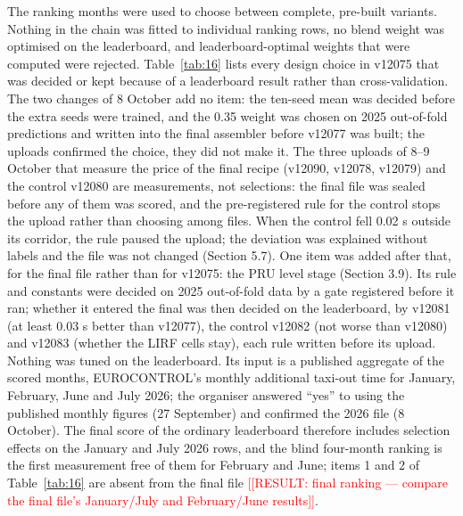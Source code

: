 \documentclass[11pt,a4paper]{article}
\newcommand{\placeholder}[1]{\textcolor{red}{[[RESULT:#1]]}}
\begin{document}
The ranking months were used to choose between complete, pre-built variants. Nothing in the chain was fitted to individual ranking rows, no blend weight was optimised on the leaderboard, and leaderboard-optimal weights that were computed were rejected. Table~\ref{tab:16} lists every design choice in v12075 that was decided or kept because of a leaderboard result rather than cross-validation. The two changes of 8 October add no item: the ten-seed mean was decided before the extra seeds were trained, and the 0.35 weight was chosen on 2025 out-of-fold predictions and written into the final assembler before v12077 was built; the uploads confirmed the choice, they did not make it. The three uploads of 8--9 October that measure the price of the final recipe (v12090, v12078, v12079) and the control v12080 are measurements, not selections: the final file was sealed before any of them was scored, and the pre-registered rule for the control stops the upload rather than choosing among files. When the control fell 0.02 s outside its corridor, the rule paused the upload; the deviation was explained without labels and the file was not changed (Section 5.7). One item was added after that, for the final file rather than for v12075: the PRU level stage (Section 3.9). Its rule and constants were decided on 2025 out-of-fold data by a gate registered before it ran; whether it entered the final was then decided on the leaderboard, by v12081 (at least 0.03 s better than v12077), the control v12082 (not worse than v12080) and v12083 (whether the LIRF cells stay), each rule written before its upload. Nothing was tuned on the leaderboard. Its input is a published aggregate of the scored months, EUROCONTROL's monthly additional taxi-out time for January, February, June and July 2026; the organiser answered ``yes'' to using the published monthly figures (27 September) and confirmed the 2026 file (8 October). The final score of the ordinary leaderboard therefore includes selection effects on the January and July 2026 rows, and the blind four-month ranking is the first measurement free of them for February and June; items 1 and 2 of Table~\ref{tab:16} are absent from the final file \placeholder{ final ranking --- compare the final file's January/July and February/June results}.
\end{document}
